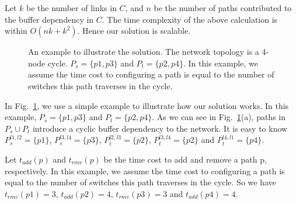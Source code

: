 Let $k$ be the number of links in $C$, and $n$ be the number of paths contributed to the buffer dependency in $C$. The time complexity of the above calculation is within $O(nk + k^2)$. Hence our solution is scalable.

\begin{figure}[t]
	\centering
	
	
	
	\caption{An example to illustrate the solution. The network topology is a 4-node cycle. $P_s=\{p1, p3\}$ and $P_t=\{p2, p4\}$. In this example, we assume the time cost to configuring a path is equal to the number of switches this path traverses in the cycle.}\label{fig:solution_example1}
	
\end{figure}

In Fig.~\ref{fig:solution_example1}, we use a simple example to illustrate how our solution works. In this example, $P_s=\{p1, p3\}$ and $P_t=\{p2, p4\}$. As we can see in Fig.~\ref{fig:solution_example1}(a), paths in $P_s \cup P_t$ introduce a cyclic buffer dependency to the network. It is easy to know $P_s^{l1,l2} = \{p1\}$, $P_s^{l3,l4} = \{p3\}$, $P_t^{l2,l3} = \{p2\}$, $P_t^{l3,l4} = \{p2\}$ and $P_t^{l4,l1} = \{p4\}$.

Let $t_{add}(p)$ and $t_{rmv}(p)$ be the time cost to add and remove a path p, respectively. In this example, we assume  the time cost to configuring a path is equal to the number of switches this path traverses in the cycle. So we have $t_{rmv}(p1)=3$, $t_{add}(p2)=4$, $t_{rmv}(p3)=3$ and $t_{add}(p4)=4$.

